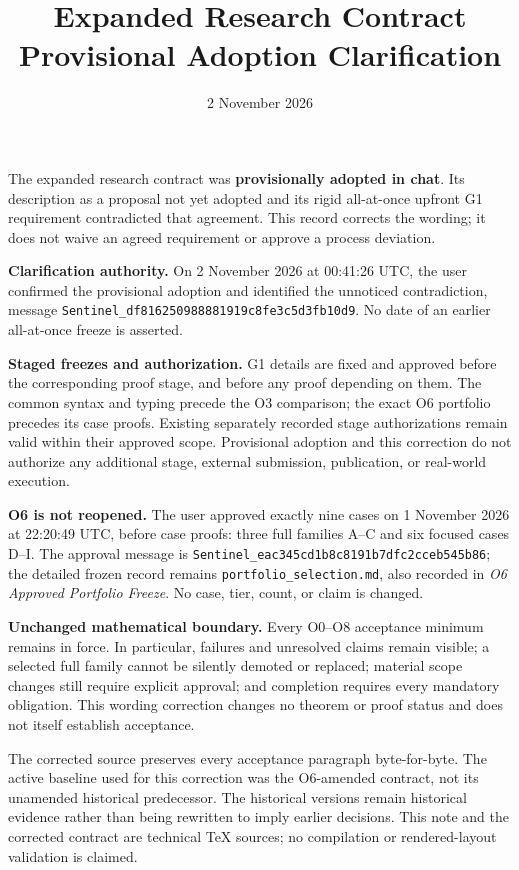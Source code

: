 \documentclass[11pt,a4paper]{article}
\title{Expanded Research Contract Provisional Adoption Clarification}
\author{}
\date{2 November 2026}
\begin{document}
\maketitle

The expanded research contract was \textbf{provisionally adopted in chat}.
Its description as a proposal not yet adopted and its rigid all-at-once
upfront G1 requirement contradicted that agreement. This record corrects
the wording; it does not waive an agreed requirement or approve a process
deviation.

\textbf{Clarification authority.} On 2 November 2026 at 00:41:26 UTC,
the user confirmed the provisional adoption and identified the unnoticed
contradiction, message
\texttt{Sentinel\_df816250988881919c8fe3c5d3fb10d9}.
No date of an earlier all-at-once freeze is asserted.

\textbf{Staged freezes and authorization.} G1 details are fixed and approved
before the corresponding proof stage, and before any proof depending on
them. The common syntax and typing precede the O3 comparison; the exact O6
portfolio precedes its case proofs. Existing separately recorded stage
authorizations remain valid within their approved scope. Provisional adoption
and this correction do not authorize any additional stage, external
submission, publication, or real-world execution.

\textbf{O6 is not reopened.} The user approved exactly nine cases on
1 November 2026 at 22:20:49 UTC, before case proofs: three full families
A--C and six focused cases D--I. The approval message is
\texttt{Sentinel\_eac345cd1b8c8191b7dfc2cceb545b86}; the detailed frozen
record remains \texttt{portfolio\_selection.md}, also recorded in
\emph{O6 Approved Portfolio Freeze}. No case, tier, count, or claim is changed.

\textbf{Unchanged mathematical boundary.} Every O0--O8 acceptance minimum
remains in force. In particular, failures and unresolved claims remain
visible; a selected full family cannot be silently demoted or replaced;
material scope changes still require explicit approval; and completion
requires every mandatory obligation. This wording correction changes no
theorem or proof status and does not itself establish acceptance.

The corrected source preserves every acceptance paragraph byte-for-byte.
The active baseline used for this correction was the O6-amended contract,
not its unamended historical predecessor. The historical versions remain
historical evidence rather than being rewritten to imply earlier decisions.
This note and the corrected contract are technical TeX sources; no
compilation or rendered-layout validation is claimed.
\end{document}
